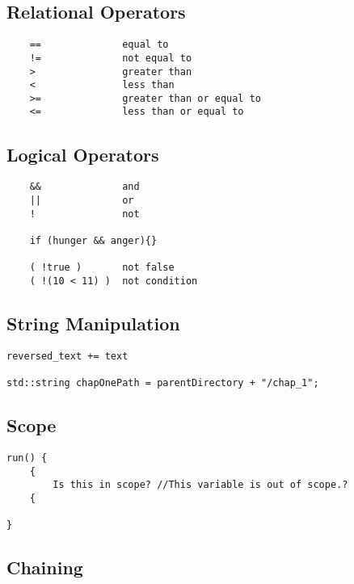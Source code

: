 \subsection{Relational Operators}

\begin{verbatim}
    ==              equal to
    !=              not equal to
    >               greater than
    <               less than
    >=              greater than or equal to
    <=              less than or equal to
\end{verbatim}

\subsection{Logical Operators}

\begin{verbatim}
    &&              and 
    ||              or
    !               not

    if (hunger && anger){}

    ( !true )       not false
    ( !(10 < 11) )  not condition 
\end{verbatim}

\subsection{String Manipulation}

\begin{verbatim}
reversed_text += text

std::string chapOnePath = parentDirectory + "/chap_1";
\end{verbatim}

\subsection{Scope}

\begin{verbatim}
run() {
    {
        Is this in scope? //This variable is out of scope.?
    {
    
}
\end{verbatim}

\subsection{Chaining}

